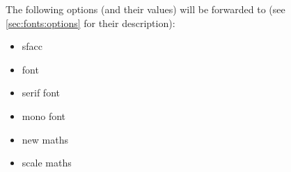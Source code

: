The following options (and their values) will be forwarded to 
(see \autoref{sec:fonts:options} for their description):
\begin{itemize}
  \ttfamily
  \item sfacc
  \item font
  \item serif font
  \item mono font
  \item new maths
  \item scale maths
\end{itemize}
